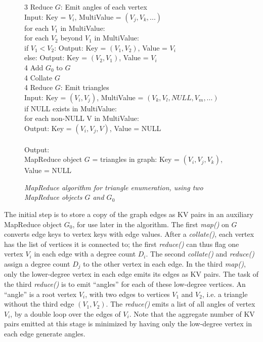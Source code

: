\begin{figure}[htb]
\begin{center}
{\begin{minipage}{\textwidth}
\begin{tabbing}
3 Reduce $G$: \> \> Emit angles of each vertex \\
              \> \> \> Input: Key = $V_i$, MultiValue = $(V_j, V_k, ...)$ \\
	      \> \> \> for each $V_1$ in MultiValue: \\
	      \> \> \> \> for each $V_2$ beyond $V_1$ in MultiValue: \\
	      \> \> \> \> \> if $V_1 < V_2$: Output: Key = $(V_1,V_2)$, Value = $V_i$ \\
	      \> \> \> \> \> else: Output: Key = $(V_2,V_1)$, Value = $V_i$ \\
4 Add $G_0$ to $G$ \\
4 Collate $G$ \\
4 Reduce $G$: \> \> Emit triangles \\
              \> \> \> Input: Key = $(V_i,V_j)$, MultiValue = $(V_k,V_l,NULL,V_m,...)$ \\
              \> \> \> if NULL exists in MultiValue: \\
	      \> \> \> \> for each non-NULL V in MultiValue: \\
	      \> \> \> \> \> Output: Key = $(V_i,V_j,V)$, Value = NULL \\
\\
Output: \\
\> MapReduce object $G$ = triangles in graph: Key = $(V_i,V_j,V_k)$, Value = NULL 
  \end{tabbing}
 \end{minipage}}\end{center}

 \caption{\it MapReduce algorithm for triangle enumeration, using two MapReduce objects $G$ and $G_0$}

 \label{fig:tri}
\end{figure}

The initial step is to store a copy of the graph edges as KV pairs in
an auxiliary MapReduce object $G_0$, for use later in the algorithm.
The first {\it map()} on $G$ converts edge keys to vertex keys with
edge values.  After a {\it collate()}, each vertex has the list of
vertices it is connected to; the first {\it reduce()} can thus flag
one vertex $V_i$ in each edge with a degree count $D_i$.  The second
{\it collate()} and {\it reduce()} assign a degree count $D_j$ to the
other vertex in each edge.  In the third {\it map()}, only the
lower-degree vertex in each edge emits its edges as KV pairs.  The
task of the third {\it reduce()} is to emit ``angles'' for each of
these low-degree vertices.  An ``angle'' is a root vertex $V_i$, with
two edges to vertices $V_1$ and $V_2$, i.e. a triangle without the
third edge $(V_1,V_2)$.  The {\it reduce()} emits a list of all angles
of vertex $V_i$, by a double loop over the edges of $V_i$.  Note that
the aggregate number of KV pairs emitted at this stage is minimized by
having only the low-degree vertex in each edge generate angles.

